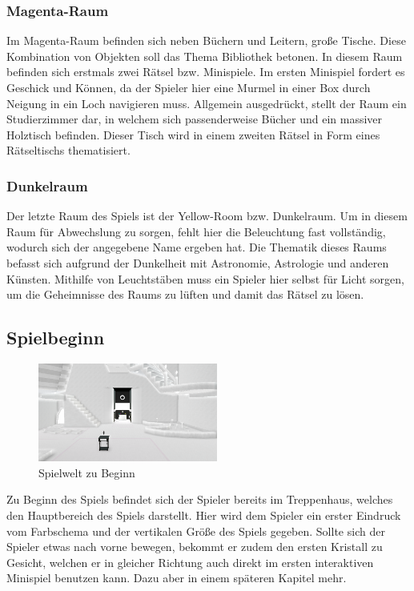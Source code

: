 \subsubsection{Magenta-Raum}
Im Magenta-Raum befinden sich neben Büchern und Leitern, große Tische. Diese Kombination von Objekten soll das Thema \dq Bibliothek \dq betonen. In diesem Raum befinden sich erstmals zwei Rätsel bzw. Minispiele. Im ersten Minispiel fordert es Geschick und Können, da der Spieler hier eine Murmel in einer Box durch Neigung in ein Loch navigieren muss. Allgemein ausgedrückt, stellt der Raum ein Studierzimmer dar, in welchem sich passenderweise Bücher und ein massiver Holztisch befinden. Dieser Tisch wird in einem zweiten Rätsel in Form eines Rätseltischs thematisiert.
\subsubsection{Dunkelraum}
Der letzte Raum des Spiels ist der Yellow-Room bzw. Dunkelraum. Um in diesem Raum für Abwechslung zu sorgen, fehlt hier die Beleuchtung fast vollständig, wodurch sich der angegebene Name ergeben hat. Die Thematik dieses Raums befasst sich aufgrund der Dunkelheit mit Astronomie, Astrologie und anderen Künsten. Mithilfe von Leuchtstäben muss ein Spieler hier selbst für Licht sorgen, um die Geheimnisse des Raums zu lüften und damit das Rätsel zu lösen.

\newpage
\noindent
\subsection{Spielbeginn}
\begin{figure}
	\vspace*{-0.5cm}
	\includegraphics[width=5.9cm]{Pictures/Lobby_Start}
	\caption{Spielwelt zu Beginn}
	\vspace*{-0.5cm}
	\label{fig:spielwelt-beginn}
\end{figure}
Zu Beginn des Spiels befindet sich der Spieler bereits im Treppenhaus, welches den Hauptbereich des Spiels darstellt. Hier wird dem Spieler ein erster Eindruck vom Farbschema und der vertikalen Größe des Spiels gegeben. Sollte sich der Spieler etwas nach vorne bewegen, bekommt er zudem den ersten Kristall zu Gesicht, welchen er in gleicher Richtung auch direkt im ersten interaktiven Minispiel benutzen kann. Dazu aber in einem späteren Kapitel mehr.\\
